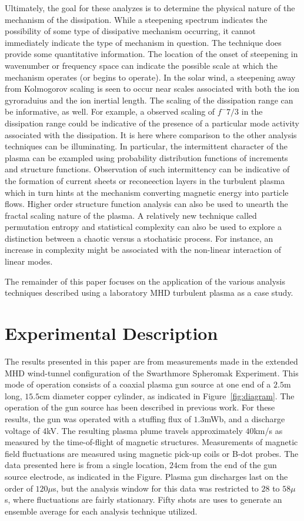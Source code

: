 \documentclass[aip,pop,amsmath,amssymb,reprint,superscriptaddress]{revtex4-1} %
\begin{document}
Ultimately, the goal for these analyzes is to determine the physical nature of the mechanism of the dissipation. While a steepening spectrum indicates the possibility of some type of dissipative mechanism occurring, it cannot immediately indicate the type of mechanism in question. The technique does provide some quantitative information. The location of the onset of steepening in wavenumber or frequency space can indicate the possible scale at which the mechanism operates (or begins to operate). In the solar wind, a steepening away from Kolmogorov scaling is seen to occur near scales associated with both the ion gyroraduius and the ion inertial length. The scaling of the dissipation range can be informative, as well. For example, a observed scaling of $f^-7/3$ in the dissipation range could be indicative of the presence of a particular mode activity associated with the dissipation. It is here where comparison to the other analysis techniques can be illuminating. In particular, the intermittent character of the plasma can be exampled using probability distribution functions of increments and structure functions. Observation of such intermittency can be indicative of the formation of current sheets or reconeection layers in the turbulent plasma which in turn hints at the mechanism converting magnetic energy into particle flows. Higher order structure function analysis can also be used to unearth the fractal scaling nature of the plasma. A relatively new technique called permutation entropy and statistical complexity can also be used to explore a distinction between a chaotic versus a stochatisic process. For instance, an increase in complexity might be associated with the non-linear interaction of linear modes.

The remainder of this paper focuses on the application of the various analysis techniques described using a laboratory MHD turbulent plasma as a case study.

\section{Experimental Description}

The results presented in this paper are from measurements made in the extended MHD wind-tunnel configuration of the Swarthmore Spheromak Experiment. This mode of operation consists of a coaxial plasma gun source at one end of a $2.5$m long, $15.5$cm diameter copper cylinder, as indicated in Figure~\ref{fig:diagram}. The operation of the gun source has been described in previous work. For these results, the gun was operated with a stuffing flux of $1.3$mWb, and a discharge voltage of 4kV. The resulting plasma plume travels approximately $40$km/s as measured by the time-of-flight of magnetic structures. Measurements of magnetic field fluctuations are measured using magnetic pick-up coils or B-dot probes. The data presented here is from a single location, $24$cm from the end of the gun source electrode, as indicated in the Figure. Plasma gun discharges last on the order of $120\mu$s, but the analysis window for this data was restricted to $28$ to $58\mu$s, where fluctuations are fairly stationary. Fifty shots are uses to generate an ensemble average for each analysis technique utilized.
\end{document}

